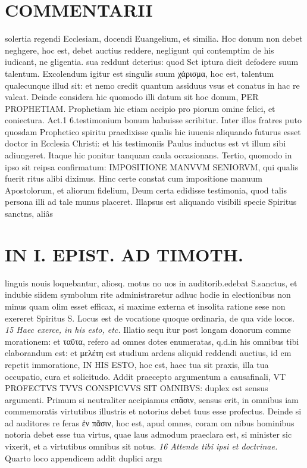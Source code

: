 \documentclass{article}
\begin{document}
\begin{pages}
\section*{COMMENTARII }
\marginpar{[ p.112 ]}\pstart solertia regendi Ecclesiam, docendi Euangelium, et similia. Hoc donum non debet neghgere, hoc est, debet auctius reddere, negligunt qui contemptim de his iudicant, ne gligentia. sua reddunt deterius: quod Sct iptura dicit defodere suum talentum. Excolendum igitur est singulis suum χάρισμα, hoc est, talentum qualecunque illud sit: et nemo credit quantum assiduus vsus et conatus in hac re valeat.  \pend\pstart Deinde considera hic quomodo illi datum sit hoc donum, PER PROPHETIAM. Prophetiam hic etiam accipio pro piorum omine felici, et coniectura. Act.1 6.testimonium bonum habuisse scribitur. Inter illos fratres puto quosdam Prophetico spiritu praedixisse qualis hic iuuenis aliquando futurus esset doctor in Ecclesia Christi: et his testimoniis Paulus inductus est vt illum sibi adiungeret. Itaque hic ponitur tanquam caula occasionans.  \pend\pstart Tertio, quomodo in ipso sit reipsa confirmatum: IMPOSITIONE MANVVM SENIORVM, qui qualis fuerit ritus alibi diximus. Hinc certe constat cum impositione manuum Apostolorum, et aliorum fidelium, Deum certa edidisse testimonia, quod talis persona illi ad tale munus placeret. Illapsus est aliquando visibili specie Spiritus sanctns, aliâs  \pend
\section*{IN I. EPIST. AD TIMOTH. }
\marginpar{[ p.113 ]}\pstart linguis nouis loquebantur, aliosq. motus no uos in auditorib.edebat S.sanctus, et indubie siidem symbolum rite administraretur adhuc hodie in electionibus non minus quam olim esset efficax, si maxime externa et insolita ratione sese non exereret Spiritus S. Locus est de vocatione quoque ordinaria, de qua vide locos.  \pend
\textit{15 Haec exerce, in his esto, etc. }\pstart Illatio sequ itur post longam donorum comme morationem: et ταῦτα, refero ad omnes dotes enumeratas, q.d.in his omnibus tibi elaborandum est: et μελέτη est studium ardens aliquid reddendi auctius, id em repetit immoratione, IN HIS ESTO, hoc est, haec tua sit praxis, illa tua occupatio, cura et solicitudo. Addit praecepto argumentum a causafinali, VT PROFECTVS TVVS CONSPICVVS SIT OMNIBVS: duplex est sensus argumenti. Primum si neutraliter accipiamus eπᾶσιν, sensus erit, in omnibus iam commemoratis virtutibus illustris et notorius debet tuus esse profectus. Deinde si ad auditores re feras ἐν πᾶσιν, hoc est, apud omnes, coram om nibus hominibus notoria debet esse tua virtus, quae laus admodum praeclara est, si minister sic vixerit, et a virtutibus omnibus sit notus.  \pend
\textit{16 Attende tibi ipsi et doctrinae. }\pstart Quarto loco appendicem addit duplici argu\pend

\end{pages}
\end{document}
